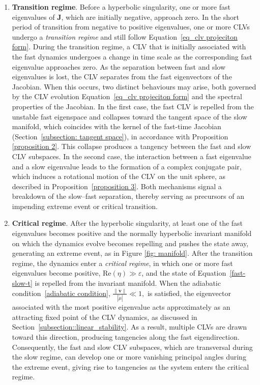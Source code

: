 \documentclass[aps,reprint,prx]{revtex4-2}
\begin{document}
\begin{enumerate}
\item {\textbf{Transition regime}}. {Before a hyperbolic singularity, one or more fast eigenvalues of $\mathbf{J}$, which are initially negative, approach zero. In the short period of transition from negative to positive eigenvalues, one or more CLVs undergo a \textit{transition regime} and still follow Equation~\eqref{eq_clv projeciton form}. {During the transition regime, a CLV that is initially associated with the fast dynamics undergoes a change in time scale as the corresponding fast eigenvalue approaches zero. As the separation between fast and slow eigenvalues is lost, the CLV separates from the fast eigenvectors of the Jacobian.} When this occurs, two distinct behaviours may arise, both governed by the CLV evolution Equation~\eqref{eq_clv projeciton form} and the spectral properties of the Jacobian. In the first case, the fast CLV is repelled from the unstable fast eigenspace and collapses toward the tangent space of the slow manifold, which coincides with the kernel of the fast-time Jacobian (Section~\ref{subsection: tangent space}), in accordance with Proposition \ref{proposition 2}. This collapse produces a tangency between the fast and slow CLV subspaces. In the second case, the interaction between a fast eigenvalue and a slow eigenvalue leads to the formation of a complex conjugate pair, which induces a rotational motion of the CLV on the unit sphere, as described in Proposition~\ref{proposition 3}. Both mechanisms signal a breakdown of the slow–fast separation, thereby serving as precursors of an impending extreme event or critical transition.}

\item {\textbf{Critical regime}}. After the hyperbolic singularity, at least one of the fast eigenvalues becomes positive and the normally hyperbolic invariant manifold on which the dynamics evolve becomes repelling and pushes the state away, generating an extreme event, as in Figure \ref{fig: manifold}. {After the transition regime, the dynamics enter a \textit{critical regime}, in which one or more fast eigenvalues become positive, $\mathrm{Re}(\eta) \gg \varepsilon$, and the state of Equation~\eqref{fast-slow-t} is repelled from the invariant manifold. When the adiabatic condition~\eqref{adiabatic condition}, $\frac{\|\dot{\mathbf{v}}\|}{|\tilde{\mu}|} \ll 1,$ is satisfied, the eigenvector associated with the most positive eigenvalue acts approximately as an attracting fixed point of the CLV dynamics, as discussed in Section~\ref{subsection::linear_stability}. As a result, multiple CLVs are drawn toward this direction, producing tangencies along the fast eigendirection. Consequently, the fast and slow CLV subspaces, which are transversal during the slow regime, can develop one or more vanishing principal angles during the extreme event, giving rise to tangencies as the system enters the critical regime.}

\end{enumerate} 
\end{document}
